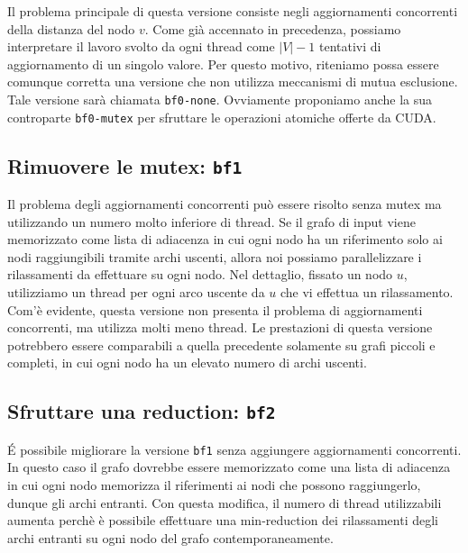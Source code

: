 \documentclass[a4paper]{article}
\begin{document}
	Il problema principale di questa versione consiste negli aggiornamenti concorrenti della distanza del nodo $v$. Come già accennato in precedenza, possiamo interpretare il lavoro svolto da ogni thread come $|V|-1$ tentativi di aggiornamento di un singolo valore. Per questo motivo, riteniamo possa essere comunque corretta una versione che non utilizza meccanismi di mutua esclusione. Tale versione sarà chiamata \texttt{bf0-none}. Ovviamente proponiamo anche la sua controparte \texttt{bf0-mutex} per sfruttare le operazioni atomiche offerte da CUDA.
	
	\subsection{Rimuovere le mutex: \texttt{bf1}}
	Il problema degli aggiornamenti concorrenti può essere risolto senza mutex ma utilizzando un numero molto inferiore di thread. Se il grafo di input viene memorizzato come lista di adiacenza in cui ogni nodo ha un riferimento solo ai nodi raggiungibili tramite archi uscenti, allora noi possiamo parallelizzare i rilassamenti da effettuare su ogni nodo. Nel dettaglio, fissato un nodo $u$, utilizziamo un thread per ogni arco uscente da $u$ che vi effettua un rilassamento. Com'è evidente, questa versione non presenta il problema di aggiornamenti concorrenti, ma utilizza molti meno thread. Le prestazioni di questa versione potrebbero essere comparabili a quella precedente solamente su grafi piccoli e completi, in cui ogni nodo ha un elevato numero di archi uscenti.
	
	\subsection{Sfruttare una reduction: \texttt{bf2}}
	\'E possibile migliorare la versione \texttt{bf1} senza aggiungere aggiornamenti concorrenti. In questo caso il grafo dovrebbe essere memorizzato come una lista di adiacenza in cui ogni nodo memorizza il riferimenti ai nodi che possono raggiungerlo, dunque gli archi entranti. Con questa modifica, il numero di thread utilizzabili aumenta perchè è possibile effettuare una min-reduction dei rilassamenti degli archi entranti su ogni nodo del grafo contemporaneamente.
	
\end{document}
